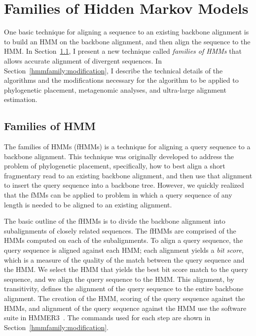 \chapter{Families of Hidden Markov Models}
\label{hmmfamily}

One basic technique for aligning a sequence to an existing backbone alignment is to build an HMM on the backbone alignment, and then align the sequence to the HMM.  In Section~\ref{hmmfamily:algorithm}, I present a new technique called \emph{families of HMMs} that allows accurate alignment of divergent sequences.  In Section~\ref{hmmfamily:modification}, I describe the technical details of the algorithms and the modifications necessary for the algorithm to be applied to phylogenetic placement, metagenomic analyses, and ultra-large alignment estimation.

\section{Families of HMM}\label{hmmfamily:algorithm}
The families of HMMs (fHMMs) is a technique for aligning a query sequence to a backbone alignment.  This technique was originally developed to address the problem of phylogenetic placement, specifically, how to best align a short fragmentary read to an existing backbone alignment, and then use that alignment to insert the query sequence into a backbone tree.  However, we quickly realized that the fMMs can be applied to problem in which a query sequence of any length is needed to be aligned to an existing alignment.

The basic outline of the fHMMs is to divide the backbone alignment into subalignments of closely related sequences.  The fHMMs are comprised of the HMMs computed on each of the subalignments.  To align a query sequence, the query sequence is aligned against each HMM; each alignment yields a \emph{bit score}, which is a measure of the quality of the match between the query sequence and the HMM. We select the HMM that yields the best bit score match to the query sequence, and we align the query sequence to the HMM.  This alignment, by transitivity, defines the alignment of the query sequence to the entire backbone alignment.  The creation of the HMM, scoring of the query sequence against the HMMs, and alignment of the query sequence against the HMM use the software suite in HMMER3~\cite{hmmer}.  The commands used for each step are shown in Section~\ref{hmmfamily:modification}.

